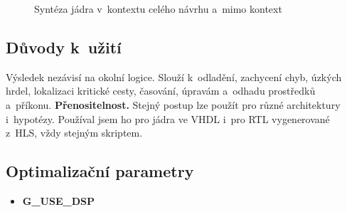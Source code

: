 
\begin{figure}[htbp]
    \centering
    \resizebox{0.95\textwidth}{!}{}
    \caption{Syntéza jádra v~kontextu celého návrhu a~mimo kontext}
    \label{fig:ooc}
\end{figure}

\subsection{Důvody k~užití}

Výsledek nezávisí na okolní logice. Slouží k~odladění, zachycení chyb, úzkých hrdel, lokalizaci kritické cesty, časování, úpravám a~odhadu prostředků a~příkonu. \textbf{Přenositelnost.} Stejný postup lze použít pro různé architektury i~hypotézy. Používal jsem ho pro jádra ve VHDL i~pro RTL vygenerované z~HLS, vždy stejným skriptem.

\subsection{Optimalizační parametry}

\begin{itemize}
    \item \textbf{G\_USE\_DSP}
\end{itemize}




